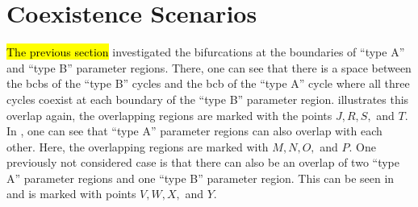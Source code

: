 \section{Coexistence Scenarios}
\label{sec:arch.coex}

\hl{The previous section} investigated the bifurcations at the boundaries of ``type A'' and ``type B'' parameter regions.
There, one can see that there is a space between the \glspl{bcb} of the ``type B'' cycles and the \gls{bcb} of the ``type A'' cycle where all three cycles coexist at each boundary of the ``type B'' parameter region.
 illustrates this overlap again, the overlapping regions are marked with the points $J, R, S,$ and $T$.
In , one can see that ``type A'' parameter regions can also overlap with each other.
Here, the overlapping regions are marked with $M, N, O,$ and $P$.
One previously not considered case is that there can also be an overlap of two ``type A'' parameter regions and one ``type B'' parameter region.
This can be seen in  and is marked with points $V, W, X,$ and $Y$.

